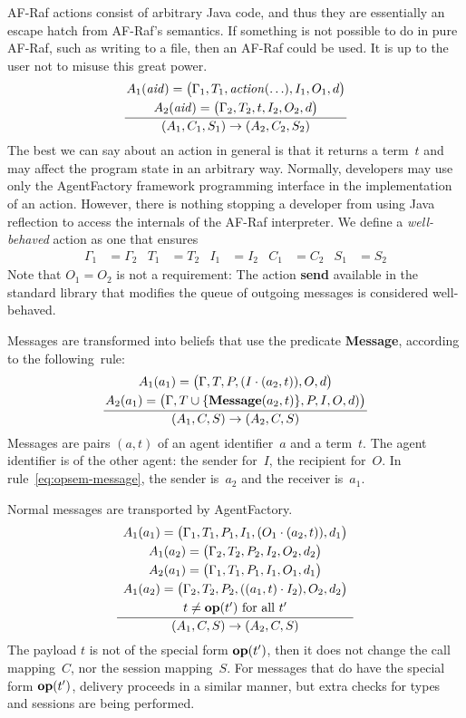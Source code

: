 \documentclass[a4paper,12pt,oneside,fleqn]{book} %
\newcommand{\on}[2]{\genfrac{}{}{0pt}{0}{\strut#1}{\strut#2}}
\begin{document}
{AF-Raf actions consist of arbitrary Java code, and thus they are
essentially an escape hatch from AF-Raf's semantics. If something is not
possible to do in pure AF-Raf, such as writing to a file, then an AF-Raf
could be used. It is up to the user not to misuse this great power.
\begin{align}
\frac
  {\on{A_1({\it aid})=\bigl(\Gamma_1,T_1,{\it action}(\ldots),I_1,O_1,d\bigr)}
      {A_2({\it aid})=\bigl(\Gamma_2,T_2,t,I_2,O_2,d\bigr)}}
  {(A_1,C_1,S_1)\to(A_2,C_2,S_2)}
\end{align}
The best we can say about an action in general is that it returns a
term~$t$ and may affect the program state in an arbitrary way. Normally,
developers may use only the AgentFactory framework programming interface in
the implementation of an action. However, there is nothing stopping a
developer from using Java reflection to access the internals of the AF-Raf
interpreter.  We define a \emph{well-behaved} action as one that ensures
\begin{align}
\Gamma_1&=\Gamma_2  & T_1&=T_2 & I_1&=I_2 & C_1 &=C_2 & S_1&=S_2
\end{align}
Note that $O_1=O_2$ is not a requirement: The action {\bf send} available
in the standard library that modifies the queue of outgoing messages is
considered well-behaved.

Messages are transformed into beliefs that use the predicate {\bf Message},
according to the following~rule:
\begin{align}
\frac
  {\on{A_1(a_1)=\bigl(\Gamma,T,P,(I\cdot(a_2,t)),O,d\bigr)}
      {A_2(a_1)=\bigl(\Gamma,T\cup\{{\bf Message}(a_2,t)\},P,I,O,d)\bigr)}}
  {(A_1,C,S)\to(A_2,C,S)}
  \label{eq:opsem-message}
\end{align}
Messages are pairs $(a,t)$ of an agent identifier~$a$ and a term~$t$. The
agent identifier is of the other agent: the sender for~$I$, the recipient
for~$O$. In rule~\eqref{eq:opsem-message}, the sender is~$a_2$ and the
receiver is~$a_1$.

Normal messages are transported by AgentFactory.
\begin{align}
\frac
  {\on{A_1(a_1)=\bigl(\Gamma_1,T_1,P_1,I_1,(O_1\cdot(a_2,t)),d_1\bigr)}
  {\on{A_1(a_2)=\bigl(\Gamma_2,T_2,P_2,I_2,O_2,d_2\bigr)}
  {\on{A_2(a_1)=\bigl(\Gamma_1,T_1,P_1,I_1,O_1,d_1\bigr)}
  {\on{A_1(a_2)=\bigl(\Gamma_2,T_2,P_2,((a_1,t)\cdot I_2),O_2,d_2\bigr)}
      {\text{$t\ne{\bf op}(t')$ for all $t'$}}}}}}
  {(A_1,C,S)\to(A_2,C,S)}
  \label{eq:opsem-msg-nonop}
\end{align}
The payload $t$ is not of the special form ${\bf op}(t')$, then it does not
change the call mapping~$C$, nor the session mapping~$S$. For messages that
do have the special form ${\bf op}(t')$, delivery proceeds in a similar
manner, but extra checks for types and sessions are being performed.

}
\end{document}
